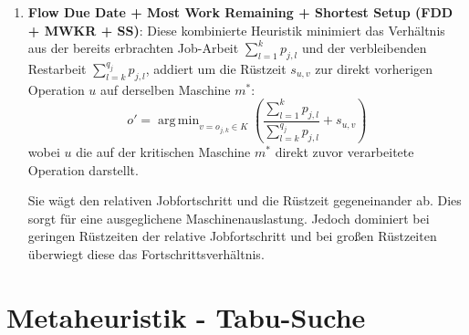 \begin{enumerate}
          Die Regel bevorzugt Jobs mit großer Restarbeit.
          Gleichzeitig wirken hohe Rüstzeiten entgegengesetzt und machen die Operation unattraktiver.
          Dies vermeidet Bottlenecks gegen Ende des Ablaufs.
          Zudem wird der gesamte Prozess und nicht nur die unmittelbar nächste Operation betrachtet.
          Ein Nachteil ist, dass die Regel die Maschinenverfügbarkeit und Operationsdauer nicht mit betrachtet.

    \item \textbf{Flow Due Date + Most Work Remaining + Shortest Setup (FDD + MWKR + SS)}: Diese kombinierte Heuristik minimiert das Verhältnis aus der bereits erbrachten Job-Arbeit $\sum_{l=1}^{k} p_{j,l}$ und der verbleibenden Restarbeit $\sum_{l=k}^{q_j} p_{j,l}$, addiert um die Rüstzeit $s_{u,v}$ zur direkt vorherigen Operation $u$ auf derselben Maschine $m^*$:
          \begin{equation}
              o' = \operatorname{arg\,min}_{v = o_{j,k} \in K} \left( \frac{\sum_{l=1}^{k} p_{j,l}}{\sum_{l=k}^{q_j} p_{j,l}} + s_{u,v} \right)
          \end{equation}
          wobei $u$ die auf der kritischen Maschine $m^*$ direkt zuvor verarbeitete Operation darstellt.

          Sie wägt den relativen Jobfortschritt und die Rüstzeit gegeneinander ab.
          Dies sorgt für eine ausgeglichene Maschinenauslastung.
          Jedoch dominiert bei geringen Rüstzeiten der relative Jobfortschritt und bei großen Rüstzeiten überwiegt diese das Fortschrittsverhältnis.
\end{enumerate}


\section{Metaheuristik - Tabu-Suche}
\label{sec:tabu-suche}


